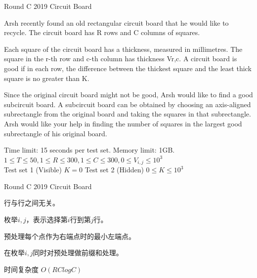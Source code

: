 \documentclass{beamer}
\begin{document}
\begin{frame}{Round C 2019 Circuit Board}

    Arsh recently found an old rectangular circuit board that he would like to recycle. The circuit board has R rows and C columns of squares.

    Each square of the circuit board has a thickness, measured in millimetres. The square in the r-th row and c-th column has thickness Vr,c. A circuit board is good if in each row, the difference between the thickest square and the least thick square is no greater than K.
    
    Since the original circuit board might not be good, Arsh would like to find a good subcircuit board. A subcircuit board can be obtained by choosing an axis-aligned subrectangle from the original board and taking the squares in that subrectangle. Arsh would like your help in finding the number of squares in the largest good subrectangle of his original board.
    
    Time limit: 15 seconds per test set. Memory limit: 1GB.\\
    $1\leq T\leq 50, 1\leq R\leq 300, 1\leq C\leq 300, 0\leq V_{i,j}\leq 10^3$\\
    Test set 1 (Visible) $K=0$
    Test set 2 (Hidden) $0\leq K\leq 10^3$
    
\end{frame}

\begin{frame}{Round C 2019 Circuit Board}

    行与行之间无关。
    
    枚举$i,j$，表示选择第$i$行到第$j$行。
    
    预处理每个点作为右端点时的最小左端点。
    
    在枚举$i,j$同时对预处理做前缀和处理。
    
    时间复杂度 $O(RClogC)$
    
\end{frame}
\end{document}
